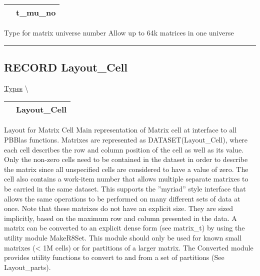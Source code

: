 {\renewcommand{\arraystretch}{1.5}
\begin{tabularx}{\textwidth}{|>{\raggedright\arraybackslash}l|X|}
\hline
\hspace{0pt}\mytexttt{\color{red} } & \textbf{t\_mu\_no} \\
\hline
\end{tabularx}
}

\par
Type for matrix universe number Allow up to 64k matrices in one universe


\rule{\linewidth}{0.5pt}
\subsection*{\textsf{\colorbox{headtoc}{\color{white} RECORD}
Layout\_Cell}}

\hypertarget{ecldoc:pbblas.types.layout_cell}{}
\hspace{0pt} \hyperlink{ecldoc:PBblas.Types}{Types} \textbackslash 

{\renewcommand{\arraystretch}{1.5}
\begin{tabularx}{\textwidth}{|>{\raggedright\arraybackslash}l|X|}
\hline
\hspace{0pt}\mytexttt{\color{red} } & \textbf{Layout\_Cell} \\
\hline
\end{tabularx}
}

\par
Layout for Matrix Cell Main representation of Matrix cell at interface to all PBBlas functions. Matrixes are represented as DATASET(Layout\_Cell), where each cell describes the row and column position of the cell as well as its value. Only the non-zero cells need to be contained in the dataset in order to describe the matrix since all unspecified cells are considered to have a value of zero. The cell also contains a work-item number that allows multiple separate matrixes to be carried in the same dataset. This supports the ''myriad'' style interface that allows the same operations to be performed on many different sets of data at once. Note that these matrixes do not have an explicit size. They are sized implicitly, based on the maximum row and column presented in the data. A matrix can be converted to an explicit dense form (see matrix\_t) by using the utility module MakeR8Set. This module should only be used for known small matrixes (< 1M cells) or for partitions of a larger matrix. The Converted module provides utility functions to convert to and from a set of partitions (See Layout\_parts).

